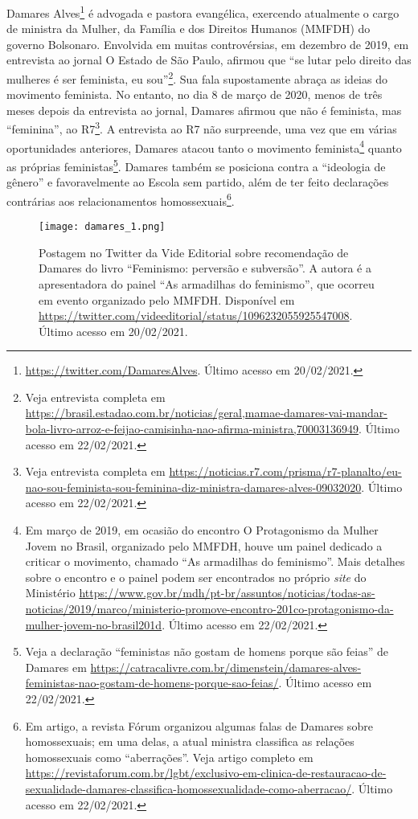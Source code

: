 \documentclass[
	12pt,				%
	openright,			%
	twoside,			%
	a4paper,			%
	english,			%
	brazil				%
	]{abntex2}
\begin{document}
\begin{anexosenv}
\begin{enumerate}
 Damares Alves\footnote{\url{https://twitter.com/DamaresAlves}. Último acesso em 20/02/2021.} é advogada e pastora evangélica, exercendo atualmente o cargo de ministra da Mulher, da Família e dos Direitos Humanos (MMFDH) do governo Bolsonaro. Envolvida em muitas controvérsias, em dezembro de 2019, em entrevista ao jornal O Estado de São Paulo, afirmou que ``se lutar pelo direito das mulheres é ser feminista, eu sou''\footnote{Veja entrevista completa em \url{https://brasil.estadao.com.br/noticias/geral,mamae-damares-vai-mandar-bola-livro-arroz-e-feijao-camisinha-nao-afirma-ministra,70003136949}. Último acesso em 22/02/2021.}. Sua fala supostamente abraça as ideias do movimento feminista. No entanto, no dia 8 de março de 2020, menos de três meses depois da entrevista ao jornal, Damares afirmou que não é feminista, mas ``feminina'', ao R7\footnote{Veja entrevista completa em \url{https://noticias.r7.com/prisma/r7-planalto/eu-nao-sou-feminista-sou-feminina-diz-ministra-damares-alves-09032020}. Último acesso em 22/02/2021.}. A entrevista ao R7 não surpreende, uma vez que em várias oportunidades anteriores, Damares atacou tanto o movimento feminista\footnote{Em março de 2019, em ocasião do encontro O Protagonismo da Mulher Jovem no Brasil, organizado pelo MMFDH, houve um painel dedicado a criticar o movimento, chamado ``As armadilhas do feminismo''. Mais detalhes sobre o encontro e o painel podem ser encontrados no próprio \textit{site} do Ministério \url{https://www.gov.br/mdh/pt-br/assuntos/noticias/todas-as-noticias/2019/marco/ministerio-promove-encontro-201co-protagonismo-da-mulher-jovem-no-brasil201d}. Último acesso em 22/02/2021.} quanto as próprias feministas\footnote{Veja a declaração ``feministas não gostam de homens porque são feias'' de Damares em \url{https://catracalivre.com.br/dimenstein/damares-alves-feministas-nao-gostam-de-homens-porque-sao-feias/}. Último acesso em 22/02/2021.}. Damares também se posiciona contra a ``ideologia de gênero'' e favoravelmente ao Escola sem partido, além de ter feito declarações contrárias aos relacionamentos homossexuais\footnote{Em artigo, a revista Fórum organizou algumas falas de Damares sobre homossexuais; em uma delas, a atual ministra classifica as relações homossexuais como ``aberrações''. Veja artigo completo em  \url{https://revistaforum.com.br/lgbt/exclusivo-em-clinica-de-restauracao-de-sexualidade-damares-classifica-homossexualidade-como-aberracao/}. Último acesso em 22/02/2021.}.
 
 \begin{figure}[!htbp]
    \centering
    \texttt{[image: damares\_1.png]}
    \caption{Postagem no Twitter da Vide Editorial sobre recomendação de Damares do livro ``Feminismo: perversão e subversão''. A autora é a apresentadora do painel ``As armadilhas do feminismo'', que ocorreu em evento organizado pelo MMFDH. Disponível em \url{https://twitter.com/videeditorial/status/1096232055925547008}. Último acesso em 20/02/2021.}
 \end{figure}
  

\end{enumerate}
\end{anexosenv}
\end{document}
